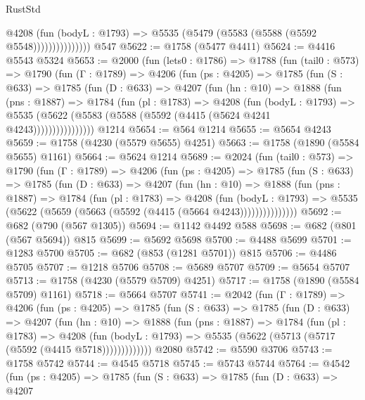 \begin{lexlean}{RustStd}
\begin{coremodule}
                      @4208
                        (fun (bodyL : @1793) =>
                        @5535 (@5479 (@5583 (@5588 (@5592 @5548)))))))))))))))
    @547
@5622 := @1758 (@5477 @4411)
@5624 := @4416 @5543 @5324
@5653 := @2000
    (fun (lets0 : @1786) =>
    @1788
      (fun (tail0 : @573) =>
      @1790
        (fun (Γ : @1789) =>
        @4206
          (fun (ps : @4205) =>
          @1785
            (fun (S : @633) =>
            @1785
              (fun (D : @633) =>
              @4207
                (fun (hn : @10) =>
                @1888
                  (fun (pns : @1887) =>
                  @1784
                    (fun (pl : @1783) =>
                    @4208
                      (fun (bodyL : @1793) =>
                      @5535 (@5622 (@5583 (@5588 (@5592 (@4415 (@5624 @4241 @4243))))))))))))))))
    @1214
@5654 := @564 @1214
@5655 := @5654 @4243
@5659 := @1758 (@4230 (@5579 @5655) @4251)
@5663 := @1758 (@1890 (@5584 @5655) @1161)
@5664 := @5624 @1214
@5689 := @2024
    (fun (tail0 : @573) =>
    @1790
      (fun (Γ : @1789) =>
      @4206
        (fun (ps : @4205) =>
        @1785
          (fun (S : @633) =>
          @1785
            (fun (D : @633) =>
            @4207
              (fun (hn : @10) =>
              @1888
                (fun (pns : @1887) =>
                @1784
                  (fun (pl : @1783) =>
                  @4208
                    (fun (bodyL : @1793) =>
                    @5535 (@5622 (@5659 (@5663 (@5592 (@4415 (@5664 @4243)))))))))))))))
@5692 := @682 (@790 (@567 @1305))
@5694 := @1142 @4492 @588
@5698 := @682 (@801 (@567 @5694)) @815
@5699 := @5692 @5698
@5700 := @4488 @5699
@5701 := @1283 @5700
@5705 := @682 (@853 (@1281 @5701)) @815
@5706 := @4486 @5705
@5707 := @1218 @5706
@5708 := @5689 @5707
@5709 := @5654 @5707
@5713 := @1758 (@4230 (@5579 @5709) @4251)
@5717 := @1758 (@1890 (@5584 @5709) @1161)
@5718 := @5664 @5707
@5741 := @2042
    (fun (Γ : @1789) =>
    @4206
      (fun (ps : @4205) =>
      @1785
        (fun (S : @633) =>
        @1785
          (fun (D : @633) =>
          @4207
            (fun (hn : @10) =>
            @1888
              (fun (pns : @1887) =>
              @1784
                (fun (pl : @1783) =>
                @4208
                  (fun (bodyL : @1793) =>
                  @5535 (@5622 (@5713 (@5717 (@5592 (@4415 @5718)))))))))))))
    @2080
@5742 := @5590 @3706
@5743 := @1758 @5742
@5744 := @4545 @5718
@5745 := @5743 @5744
@5764 := @4542
    (fun (ps : @4205) =>
    @1785
      (fun (S : @633) =>
      @1785
        (fun (D : @633) =>
        @4207

\end{coremodule}
\end{lexlean}
